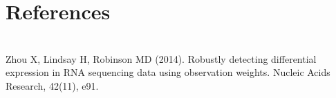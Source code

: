 \documentclass{article}
\begin{document}
\section{References}
\paragraph{} \hspace{0pt} \\
Zhou X, Lindsay H, Robinson MD (2014). Robustly detecting differential expression in RNA sequencing data using observation weights. Nucleic Acids Research, 42(11), e91.
\end{document}
